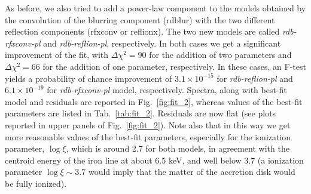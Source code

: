 \documentclass{aa}
\begin{document}
As  before, we also tried to add a power-law component to the models obtained 
by the convolution of the blurring component (rdblur) with the two different 
reflection components (rfxconv or reflionx). The two new models are called 
\emph{rdb-rfxconv-pl} and \emph{rdb-reflion-pl}, respectively. In both cases
we get a significant improvement of the fit, with $\Delta \chi^2 = 90$ for 
the addition of two parameters and $\Delta \chi^2 = 66$ for the addition of 
one parameter, respectively. In these cases, an F-test yields a probability of 
chance improvement of $3.1 \times 10^{-15}$ for \emph{rdb-reflion-pl} and 
$6.1 \times 10^{-19}$ for \emph{rdb-rfxconv-pl} model, respectively. 
 Spectra, along with best-fit model and residuals are reported in Fig.\ \ref{fig:fit_2}, 
whereas values of the best-fit parameters are listed in Tab.\ \ref{tab:fit_2}.
Residuals are now flat (see plots reported in upper panels of Fig.\ \ref{fig:fit_2}). 
Note also that in this way  we get more reasonable values of the best-fit parameters,
especially for the ionization parameter, $\log \xi$, which is around 2.7
for both models, in agreement with the centroid energy of the iron line at about
6.5 keV, and well below 3.7 (a ionization parameter $\log \xi \sim 3.7$ 
would imply that the matter of the accretion disk would be fully ionized). 

\end{document}
